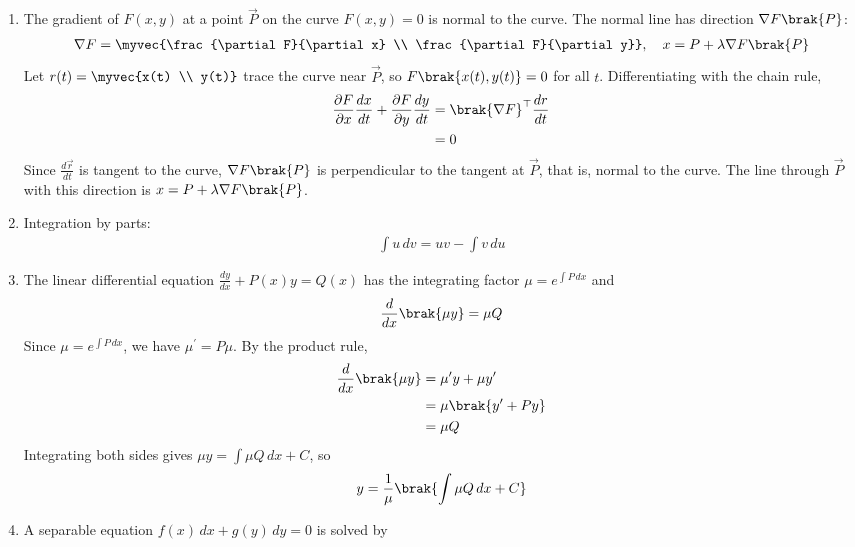 \begin{enumerate}[label=\thesubsection.\arabic*, ref=\thesubsection.\theenumi]
\item The gradient of $F(x,y)$ at a point $\vec{P}$ on the curve $F(x,y) = 0$ is normal to the curve. The normal line has direction $\nabla F\brak{\vec{P}}$:
\begin{align}
	\nabla F = \myvec{\frac{\partial F}{\partial x} \\ \frac{\partial F}{\partial y}}, \quad \vec{x} = \vec{P} + \lambda\nabla F\brak{\vec{P}} \label{eq:EE26BTECH11205-grad-normal}
\end{align}
\solution Let $\vec{r}(t) = \myvec{x(t) \\ y(t)}$ trace the curve near $\vec{P}$, so $F\brak{x(t),y(t)} = 0$ for all $t$. Differentiating with the chain rule,
\begin{align}
	\frac{\partial F}{\partial x}\frac{dx}{dt} + \frac{\partial F}{\partial y}\frac{dy}{dt} &= \brak{\nabla F}^{\top}\frac{d\vec{r}}{dt} \notag
	\\
	&= 0
\end{align}
Since $\frac{d\vec{r}}{dt}$ is tangent to the curve, $\nabla F\brak{\vec{P}}$ is perpendicular to the tangent at $\vec{P}$, that is, normal to the curve. The line through $\vec{P}$ with this direction is $\vec{x} = \vec{P} + \lambda\nabla F\brak{\vec{P}}$.
\item Integration by parts:
\begin{align}
	\int u\,dv = uv - \int v\,du \label{eq:EE26BTECH11205-ibp}
\end{align}
\item The linear differential equation $\frac{dy}{dx} + P(x)y = Q(x)$ has the integrating factor $\mu = e^{\int P\,dx}$ and
\begin{align}
	\frac{d}{dx}\brak{\mu y} = \mu Q \label{eq:EE26BTECH11205-linode}
\end{align}
\solution Since $\mu = e^{\int P\,dx}$, we have $\mu^{\prime} = P\mu$. By the product rule,
\begin{align}
	\frac{d}{dx}\brak{\mu y} &= \mu^{\prime}y + \mu y^{\prime} \notag
	\\
	&= \mu\brak{y^{\prime} + Py} \notag
	\\
	&= \mu Q
\end{align}
Integrating both sides gives $\mu y = \int \mu Q\,dx + C$, so
\begin{align}
	y = \frac{1}{\mu}\brak{\int \mu Q\,dx + C}
\end{align}
\item A separable equation $f(x)\,dx + g(y)\,dy = 0$ is solved by
\begin{align}

\end{align}
\end{enumerate}
